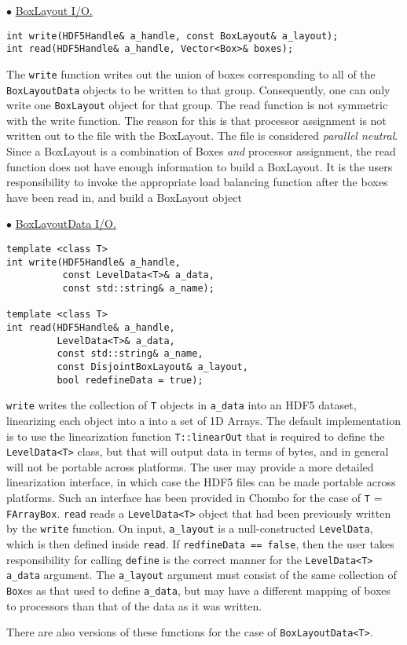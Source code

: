 \begin{trivlist}
\item $\bullet$
\underline{BoxLayout I/O.}
\begin{verbatim}
int write(HDF5Handle& a_handle, const BoxLayout& a_layout);
int read(HDF5Handle& a_handle, Vector<Box>& boxes);
\end{verbatim}
The {\tt write} function writes out the union of boxes corresponding to
all of the {\tt BoxLayoutData} objects to be written to that
group. Consequently, one can only write one {\tt BoxLayout} object for
that group. 
The read function is not symmetric with the write function. The reason
for this is that processor assignment is not written out to the file
with the BoxLayout.  The file is considered {\it parallel neutral}. Since
a BoxLayout is a combination of Boxes {\it and} processor assignment, the
read function does not have enough information to build a BoxLayout.
It is the users responsibility to invoke the appropriate load balancing
function after the boxes have been read in, and build a BoxLayout object
\item $\bullet$
\underline{BoxLayoutData I/O.}

\begin{verbatim}
template <class T>
int write(HDF5Handle& a_handle, 
          const LevelData<T>& a_data, 
          const std::string& a_name);

template <class T>
int read(HDF5Handle& a_handle, 
         LevelData<T>& a_data, 
         const std::string& a_name, 
         const DisjointBoxLayout& a_layout, 
         bool redefineData = true);
\end{verbatim}
{\tt write} writes the collection of {\tt T} objects in {\tt a\_data}
into an HDF5 dataset, linearizing each object into a 
into a set of 1D Arrays. The default implementation is to use the 
linearization function {\tt T::linearOut} that is required to define the
{\tt LevelData<T>} class, but that will output data in terms of bytes,
and in general will not be portable across platforms. The user may
provide a more detailed linearization interface, 
in which case the HDF5 files can be made portable across platforms. 
Such an interface has been provided in Chombo for the case of 
{\tt T} = {\tt FArrayBox}. {\tt read} reads a {\tt LevelData<T>} object
that had been previously written by the {\tt write} function. 
On input, {\tt a\_layout} is a null-constructed {\tt LevelData}, which
is then defined inside {\tt read}. If {\tt redfineData == false}, then
the user takes responsibility for calling {\tt define} is the correct
manner for the \verb+LevelData<T> a_data+ argument.
The {\tt a\_layout} argument must consist of the same collection of 
{\tt Box}es as that used to define {\tt a\_data}, but may have a
different mapping of boxes to processors than that of the data as it was
written.

There are also versions of these functions for the case of 
{\tt BoxLayoutData<T>}.
\end{trivlist}

